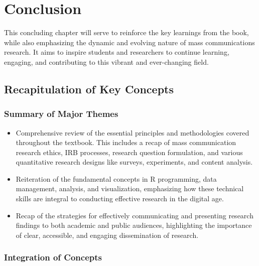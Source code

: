 \documentclass[
]{book}
\begin{document}
\hypertarget{conclusion}{%
\chapter{Conclusion}\label{conclusion}}

This concluding chapter will serve to reinforce the key learnings from the book, while also emphasizing the dynamic and evolving nature of mass communications research. It aims to inspire students and researchers to continue learning, engaging, and contributing to this vibrant and ever-changing field.

\hypertarget{recapitulation-of-key-concepts}{%
\section*{Recapitulation of Key Concepts}\label{recapitulation-of-key-concepts}}

\hypertarget{summary-of-major-themes}{%
\subsection*{Summary of Major Themes}\label{summary-of-major-themes}}

\begin{itemize}
\item
  Comprehensive review of the essential principles and methodologies covered throughout the textbook. This includes a recap of mass communication research ethics, IRB processes, research question formulation, and various quantitative research designs like surveys, experiments, and content analysis.
\item
  Reiteration of the fundamental concepts in R programming, data management, analysis, and visualization, emphasizing how these technical skills are integral to conducting effective research in the digital age.
\item
  Recap of the strategies for effectively communicating and presenting research findings to both academic and public audiences, highlighting the importance of clear, accessible, and engaging dissemination of research.
\end{itemize}

\hypertarget{integration-of-concepts}{%
\subsection*{Integration of Concepts}\label{integration-of-concepts}}
\end{document}
